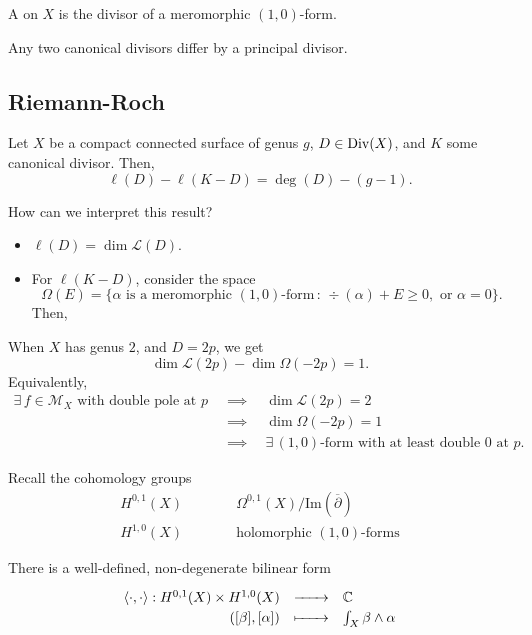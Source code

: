 \documentclass{lkx_paper}
\begin{document}
\begin{definition}
	A  on $X$ is the divisor of a meromorphic $(1,0)$-form.
\end{definition}

\begin{lemma}
	Any two canonical divisors differ by a principal divisor.
\end{lemma}

\subsection{Riemann-Roch}

\begin{theorem}
	Let $X$ be a compact connected surface of genus $g$, $D\in \mathrm{Div}(X)$, and $K$ some canonical divisor. Then,
	\[
		\ell(D) - \ell(K-D) = \deg(D)-(g-1).
	\]
\end{theorem}

How can we interpret this result?
\begin{itemize}
	\item $\ell(D) = \dim\mathcal{L}(D)$.
	\item For $\ell(K-D)$, consider the space
	      \[
		      \Omega(E) = \{\alpha \textrm{ is a meromorphic }(1,0)\textrm{-form}\, :\,\div(\alpha) + E \geq 0, \textrm{ or } \alpha = 0\}.
	      \]
	      Then,
\end{itemize}

\begin{example}
	When $X$ has genus $2$, and $D=2p$, we get
	\[
		\dim \mathcal{L}(2p)-\dim\Omega(-2p) = 1.
	\]
	Equivalently,
	\[
		\begin{aligned}
			\exists\, f\in \mathcal{M}_X\textrm{ with double pole at }p
			\quad & \implies\quad \dim\mathcal{L}(2p)=2                                       \\
			\quad & \implies\quad \dim\Omega(-2p)=1                                           \\
			\quad & \implies \quad \exists\, (1,0)\textrm{-form with at least double 0 at }p.
		\end{aligned}
	\]
\end{example}

Recall the cohomology groups
\[
	\begin{aligned}
		H^{0,1}(X) \quad\quad\quad & \Omega^{0,1}(X)/\textrm{Im}(\overline{\partial}) \\
		H^{1,0}(X) \quad\quad\quad & \textrm{holomorphic }(1,0)\textrm{-forms}
	\end{aligned}
\]
\begin{lemma}
	There is a well-defined, non-degenerate bilinear form
	\[
		\definefunction{\langle\cdot,\cdot \rangle}{H^{0,1}(X)\times H^{1,0}(X)}{\C}{([\beta], [\alpha])}{\int_X \beta\wedge \alpha}
	\]
\end{lemma}
\end{document}
